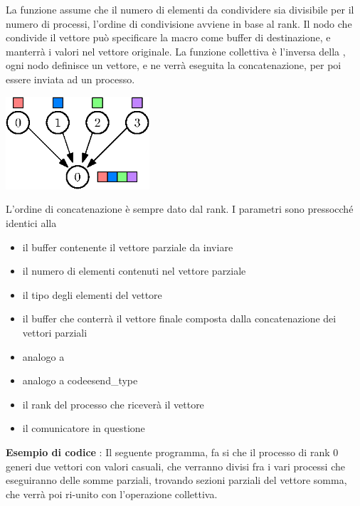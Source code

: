 \documentclass[10pt, letterpaper]{report}
\begin{document}
La funzione assume che il numero di elementi da condividere sia divisibile per il numero di processi, l'ordine 
di condivisione avviene in base al rank. Il nodo che condivide il vettore può specificare la macro 
 come buffer di destinazione, e manterrà i valori nel vettore originale.\acc 
La funzione collettiva  è l'inversa della , ogni nodo definisce un vettore, 
e ne verrà eseguita la concatenazione, per poi essere inviata ad un processo.\begin{center}
    \includegraphics[width=0.4\textwidth]{images/gather.eps}
\end{center}
L'ordine di concatenazione è sempre dato dal rank. I parametri sono pressocché identici alla \begin{itemize}
    \item {} il buffer contenente il vettore parziale da inviare
    \item  {} il numero di elementi contenuti nel vettore parziale
    \item  {} il tipo degli elementi del vettore 
    \item  {} il buffer che conterrà il vettore finale composta dalla concatenazione dei 
    vettori parziali 
    \item  {} analogo a 
    \item  {} analogo a codee{send\_type}
    \item  {} il rank del processo che riceverà il vettore
    \item {} il comunicatore in questione
\end{itemize}
\textbf{Esempio di codice} : Il seguente programma, fa si che il processo di rank 0 generi 
due vettori con valori casuali, che verranno divisi fra i vari processi che eseguiranno delle somme parziali, 
trovando sezioni parziali del vettore somma, che verrà poi ri-unito con l'operazione collettiva.
\end{document}
